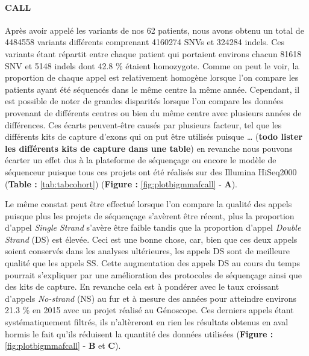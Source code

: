 \documentclass[12pt,twoside]{reedthesis}
\theoremstyle{definition}
\theoremstyle{definition}
\theoremstyle{remark}
\begin{document}
  \paragraph{CALL}\label{call-1}
  
  Après avoir appelé les variants de nos 62 patients, nous avons obtenu un
  total de 4484558 variants différents comprenant 4160274 SNVs et 324284
  indels. Ces variants étant répartit entre chaque patient qui portaient
  environs chacun 81618 SNV et 5148 indels dont 42.8 \% étaient
  homozygote. Comme on peut le voir, la proportion de chaque appel est
  relativement homogène lorsque l'on compare les patients ayant été
  séquencés dans le même centre la même année. Cependant, il est possible
  de noter de grandes disparités lorsque l'on compare les données
  provenant de différents centres ou bien du même centre avec plusieurs
  années de différences. Ces écarts peuvent-être causés par plusieurs
  facteur, tel que les différents kits de capture d'exons qui on put être
  utilisés puisque \ldots{} (\textbf{todo lister les différents kits de
  capture dans une table}) en revanche nous pouvons écarter un effet dus à
  la plateforme de séquençage ou encore le modèle de séquenceur puisque
  tous ces projets ont été réalisés sur des Illumina HiSeq2000
  (\textbf{Table : }\ref{tab:tabcohort}) (\textbf{Figure :
  }\ref{fig:plotbigmmafcall} - \textbf{A}).
  
  Le même constat peut être effectué lorsque l'on compare la qualité des
  appels puisque plus les projets de séquençage s'avèrent être récent,
  plus la proportion d'appel \emph{Single Strand} s'avère être faible
  tandis que la proportion d'appel \emph{Double Strand} (DS) est élevée.
  Ceci est une bonne chose, car, bien que ces deux appels soient conservés
  dans les analyses ultérieures, les appels DS sont de meilleure qualité
  que les appels SS. Cette augmentation des appels DS au cours du temps
  pourrait s'expliquer par une amélioration des protocoles de séquençage
  ainsi que des kits de capture. En revanche cela est à pondérer avec le
  taux croissant d'appels \emph{No-strand} (NS) au fur et à mesure des
  années pour atteindre environs 21.3 \% en 2015 avec un projet réalisé au
  Génoscope. Ces derniers appels étant systématiquement filtrés, ils
  n'altèreront en rien les résultats obtenus en aval hormis le fait qu'ils
  réduisent la quantité des données utilisées (\textbf{Figure :
  }\ref{fig:plotbigmmafcall} - \textbf{B} et \textbf{C}).
  
  \newpage
  
\end{document}
